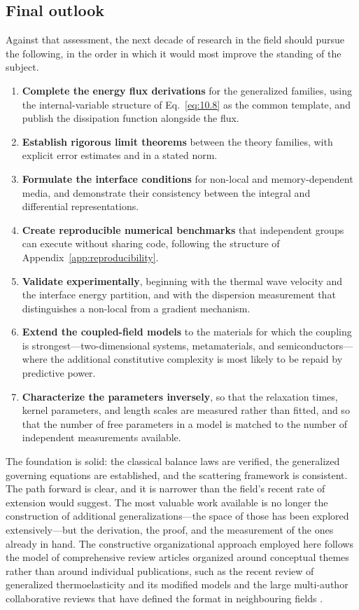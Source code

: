 \subsection{Final outlook}
\label{sec:17.5}

Against that assessment, the next decade of research in the field should pursue the following, in the order in which it would most improve the standing of the subject.

\begin{enumerate}
\item \textbf{Complete the energy flux derivations} for the generalized families, using the internal-variable structure of Eq.~\eqref{eq:10.8} as the common template, and publish the dissipation function alongside the flux.
\item \textbf{Establish rigorous limit theorems} between the theory families, with explicit error estimates and in a stated norm.
\item \textbf{Formulate the interface conditions} for non-local and memory-dependent media, and demonstrate their consistency between the integral and differential representations.
\item \textbf{Create reproducible numerical benchmarks} that independent groups can execute without sharing code, following the structure of Appendix~\ref{app:reproducibility}.
\item \textbf{Validate experimentally}, beginning with the thermal wave velocity and the interface energy partition, and with the dispersion measurement that distinguishes a non-local from a gradient mechanism.
\item \textbf{Extend the coupled-field models} to the materials for which the coupling is strongest---two-dimensional systems, metamaterials, and semiconductors---where the additional constitutive complexity is most likely to be repaid by predictive power.
\item \textbf{Characterize the parameters inversely}, so that the relaxation times, kernel parameters, and length scales are measured rather than fitted, and so that the number of free parameters in a model is matched to the number of independent measurements available.
\end{enumerate}

The foundation is solid: the classical balance laws are verified, the generalized governing equations are established, and the scattering framework is consistent. The path forward is clear, and it is narrower than the field's recent rate of extension would suggest. The most valuable work available is no longer the construction of additional generalizations---the space of those has been explored extensively---but the derivation, the proof, and the measurement of the ones already in hand. The constructive organizational approach employed here follows the model of comprehensive review articles organized around conceptual themes rather than around individual publications, such as the recent review of generalized thermoelasticity and its modified models \cite{Shakeriaski2021} and the large multi-author collaborative reviews that have defined the format in neighbouring fields \cite{Abdalla2022}.


